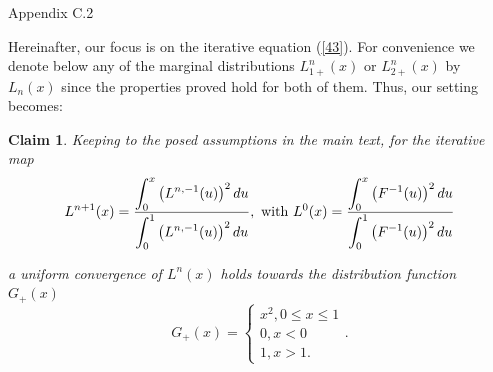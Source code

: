 \documentclass[onecolumn]{article}
\providecommand{\dint}{\displaystyle\int}
\newtheorem{claim}[theorem]{Claim}
\renewcommand{\dint}{\displaystyle\int}
\begin{document}
\begin{flushleft}
{\large Appendix C.2}
\end{flushleft}

Hereinafter, our focus is on the iterative equation (\ref{43}). For
convenience we denote below any of the marginal distributions $L_{1+}^{n}(x)$
or $L_{2+}^{n}(x)$ by $L_{n}(x)$ since the properties proved hold for both
of them. Thus, our setting becomes:

\begin{claim}
\label{major} Keeping to the posed assumptions in the main text, for the
iterative map%
\begin{equation}
L^{n+1}(x)=\frac{\dint\nolimits_{0}^{x}\left( L^{n,-1}(u)\right) ^{2}du}{%
\dint\nolimits_{0}^{1}\left( L^{n,-1}(u)\right) ^{2}du},\text{ with }%
L^{0}(x)=\frac{\dint\nolimits_{0}^{x}\left( F^{-1}(u)\right) ^{2}du}{%
\dint\nolimits_{0}^{1}\left( F^{-1}(u)\right) ^{2}du}  \label{561}
\end{equation}

a uniform convergence of $L^{n}(x)$ holds towards the distribution function $%
G_{+}(x)$%
\begin{equation}
G_{+}(x)=\left\{ 
\begin{array}{c}
x^{2},0\leq x\leq 1 \\ 
0,x<0 \\ 
1,x>1.%
\end{array}%
\right. .  \label{562}
\end{equation}
\end{claim}
\end{document}
